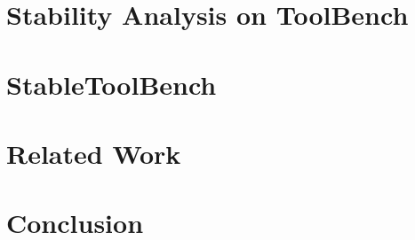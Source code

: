 \documentclass[11pt]{article}
\begin{document}
\section{Stability Analysis on ToolBench}


\section{StableToolBench}


% 

% 

% 

% 

\section{Related Work}




\section{Conclusion}
\end{document}
